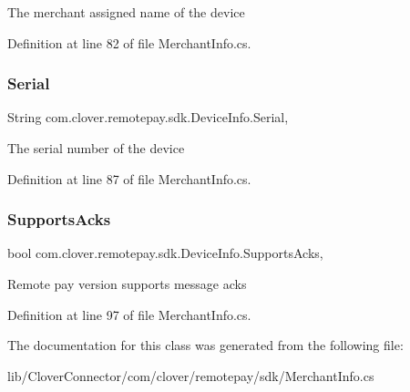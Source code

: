 The merchant assigned name of the device 



Definition at line 82 of file Merchant\+Info.\+cs.

\mbox{\label{classcom_1_1clover_1_1remotepay_1_1sdk_1_1_device_info_a71e61e0e91dbad7ca3d0f235db6f30f4}} 
\subsubsection{\texorpdfstring{Serial}{Serial}}
{\footnotesize\ttfamily String com.\+clover.\+remotepay.\+sdk.\+Device\+Info.\+Serial\hspace{0.3cm}{\ttfamily [get]}, {\ttfamily [set]}}



The serial number of the device 



Definition at line 87 of file Merchant\+Info.\+cs.

\mbox{\label{classcom_1_1clover_1_1remotepay_1_1sdk_1_1_device_info_a508f3952d0ea526c63939e66ca36ea9b}} 
\subsubsection{\texorpdfstring{Supports\+Acks}{SupportsAcks}}
{\footnotesize\ttfamily bool com.\+clover.\+remotepay.\+sdk.\+Device\+Info.\+Supports\+Acks\hspace{0.3cm}{\ttfamily [get]}, {\ttfamily [set]}}



Remote pay version supports message acks 



Definition at line 97 of file Merchant\+Info.\+cs.



The documentation for this class was generated from the following file\+:\begin{DoxyCompactItemize}
\item 
lib/\+Clover\+Connector/com/clover/remotepay/sdk/Merchant\+Info.\+cs\end{DoxyCompactItemize}
